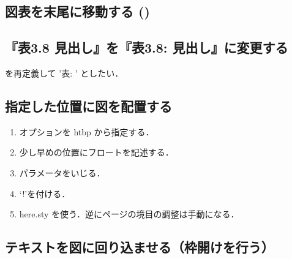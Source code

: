 \subsection{図表を末尾に移動する ()}







\subsection{『表3.8 見出し』を『表3.8: 見出し』に変更する}
を再定義して '表: ' としたい．
\begin{intext}
\def\fnum@figure{\figurename\nobreak\thefigure:\space}
\end{intext}

\begin{intext}
\def\fnum@table{\tablename\nobreak\thetable:\space} 
\end{intext}

\subsection{指定した位置に図を配置する}

\begin{enumerate}
 \item オプションを htbp から指定する．
 \item 少し早めの位置にフロートを記述する．
 \item パラメータをいじる．
 \item `!'を付ける．
 \item here.sty を使う．逆にページの境目の調整は手動になる．
 
\end{enumerate}

\subsection{テキストを図に回り込ませる（枠開けを行う）}


